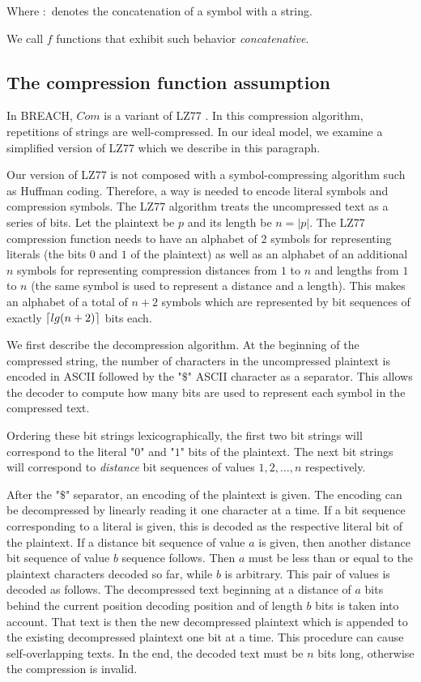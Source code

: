 \documentclass{sig-alternate-05-2015}
\DeclarePairedDelimiter{\ceil}{\lceil}{\rceil}
\begin{document}
Where $:$ denotes the concatenation of a symbol with a string.

We call $f$ functions that exhibit such behavior \textit{concatenative}.

\subsection{The compression function assumption}\label{subsec:comfuncassumption}

In BREACH, $Com$ is a variant of LZ77 \cite{c9}. In this compression algorithm,
repetitions of strings are well-compressed. In our ideal model, we examine a
simplified version of LZ77 which we describe in this paragraph.

Our version of LZ77 is not composed with a symbol-compressing algorithm such as
Huffman coding. Therefore, a way is needed to encode literal symbols and
compression symbols. The LZ77 algorithm treats the uncompressed text as a
series of bits. Let the plaintext be $p$ and its length be $n = |p|$. The LZ77
compression function needs to have an alphabet of 2 symbols for representing
literals (the bits $0$ and $1$ of the plaintext) as well as an alphabet of an
additional $n$ symbols for representing compression distances from $1$ to $n$
and lengths from $1$ to $n$ (the same symbol is used to represent a distance
and a length). This makes an alphabet of a total of $n + 2$ symbols which are
represented by bit sequences of exactly $\ceil{lg(n + 2)}$ bits each.

We first describe the decompression algorithm. At the beginning of the
compressed string, the number of characters in the uncompressed plaintext is
encoded in ASCII followed by the "$\$$" ASCII character as a separator. This
allows the decoder to compute how many bits are used to represent each symbol
in the compressed text.

Ordering these bit strings lexicographically, the first two bit strings will
correspond to the literal "$0$" and "$1$" bits of the plaintext. The next bit
strings will correspond to \textit{distance} bit sequences of values $1, 2,
\ldots, n$ respectively.

After the "$\$$" separator, an encoding of the plaintext is given. The encoding
can be decompressed by linearly reading it one character at a time. If a bit
sequence corresponding to a literal is given, this is decoded as the respective
literal bit of the plaintext. If a distance bit sequence of value $a$ is given,
then another distance bit sequence of value $b$ sequence follows.  Then $a$
must be less than or equal to the plaintext characters decoded so far, while
$b$ is arbitrary. This pair of values is decoded as follows. The decompressed
text beginning at a distance of $a$ bits behind the current position decoding
position and of length $b$ bits is taken into account. That text is then the
new decompressed plaintext which is appended to the existing decompressed
plaintext one bit at a time. This procedure can cause self-overlapping texts.
In the end, the decoded text must be $n$ bits long, otherwise the compression
is invalid.
\end{document}
